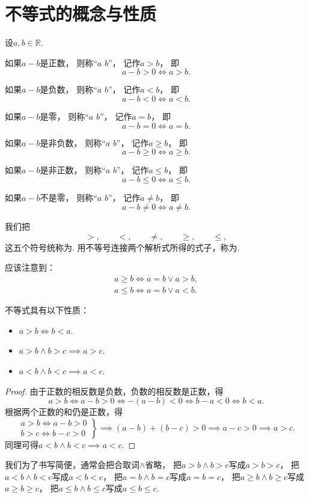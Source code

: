 \section{不等式的概念与性质}
\begin{definition}
设\(a,b\in\mathbb{R}\).

如果\(a-b\)是正数，
则称“\(a\)  \(b\)”，
记作\(a>b\)，
即\[
	a-b>0
	\iff
	a>b.
\]

如果\(a-b\)是负数，
则称“\(a\)  \(b\)”，
记作\(a<b\)，
即\[
	a-b<0
	\iff
	a<b.
\]

如果\(a-b\)是零，
则称“\(a\)  \(b\)”，
记作\(a=b\)，
即\[
	a-b=0
	\iff
	a=b.
\]

如果\(a-b\)是非负数，
则称“\(a\)  \(b\)”，
记作\(a \geq b\)，
即\[
	a-b\geq0
	\iff
	a \geq b.
\]

如果\(a-b\)是非正数，
则称“\(a\)  \(b\)”，
记作\(a \leq b\)，
即\[
	a-b\leq0
	\iff
	a \leq b.
\]

如果\(a-b\)不是零，
则称“\(a\)  \(b\)”，
记作\(a \neq b\)，
即\[
	a-b\neq0
	\iff
	a \neq b.
\]

我们把\[
	>, \qquad
	<, \qquad
	\neq, \qquad
	\geq, \qquad
	\leq,
\]这五个符号统称为.
用不等号连接两个解析式所得的式子，称为.
\end{definition}
应该注意到：\begin{gather*}
	a \geq b \iff a = b \lor a > b, \\
	a \leq b \iff a = b \lor a < b.
\end{gather*}

\begin{property}
不等式具有以下性质：\begin{itemize}
	\item \(a>b \iff b<a\).
	\item \(a>b \land b>c \implies a>c\).
	\item \(a<b \land b<c \implies a<c\).
\end{itemize}
\begin{proof}
由于正数的相反数是负数，负数的相反数是正数，得\[
	a > b \iff a-b > 0 \iff -(a-b) < 0 \iff b-a < 0 \iff b < a.
\]
根据两个正数的和仍是正数，得\[
	\left. \begin{array}{c}
		a > b \iff a-b > 0 \\
		b > c \iff b-c > 0
	\end{array} \right\}
	\implies (a-b)+(b-c) > 0
	\implies a-c > 0
	\implies a > c.
\]
同理可得\(a<b \land b<c \implies a<c\).
\end{proof}
\end{property}
我们为了书写简便，通常会把合取词\(\land\)省略，
把\(a>b \land b>c\)写成\(a>b>c\)，
把\(a<b \land b<c\)写成\(a<b<c\)，
把\(a=b \land b=c\)写成\(a=b=c\)，
把\(a \geq b \land b \geq c\)写成\(a \geq b \geq c\)，
把\(a \leq b \land b \leq c\)写成\(a \leq b \leq c\).

